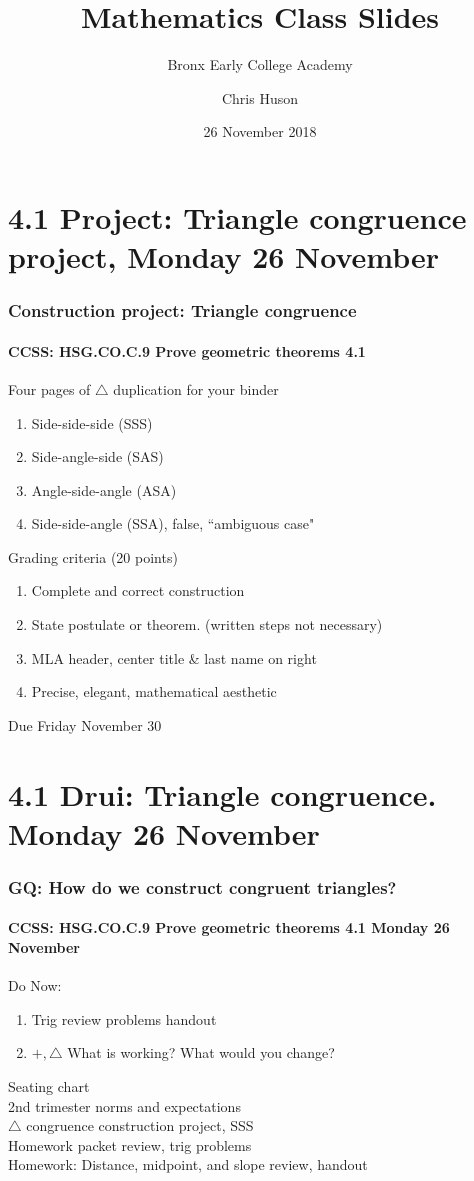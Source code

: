 \documentclass{beamer}
\title{Mathematics Class Slides}
\subtitle{Bronx Early College Academy}
\author{Chris Huson}
\date{26 November 2018}
\begin{document}
\frame{\titlepage}
\section[Outline]{}
\frame{\tableofcontents}


\section{4.1 Project: Triangle congruence project, Monday 26 November}
  \frame
  {
    \frametitle{Construction project: Triangle congruence}
    \framesubtitle{CCSS: HSG.CO.C.9 Prove geometric theorems  \alert{4.1}}

    \begin{block}{Four pages of $\triangle$ duplication for your binder}
    \begin{enumerate}
        \item Side-side-side (SSS)
        \item Side-angle-side (SAS)
        \item Angle-side-angle (ASA)
        \item Side-side-angle (SSA), false, ``ambiguous case"
    \end{enumerate}
        Grading criteria (20 points)
    \begin{enumerate}
        \item Complete and correct construction
        \item State postulate or theorem. (written steps not necessary)
        \item MLA header, center title \& last name on right
        \item Precise, elegant, mathematical aesthetic
    \end{enumerate}
    \end{block}
    Due Friday November 30
    }

  \section{4.1 Drui: Triangle congruence. Monday 26 November}
    \frame
    {
      \frametitle{GQ: How do we construct congruent triangles?}
      \framesubtitle{CCSS: HSG.CO.C.9 Prove geometric theorems  \alert{4.1 Monday 26 November}}

      \begin{block}{Do Now: }
        \begin{enumerate}
          \item Trig review problems handout
          \item $+, \triangle$ What is working? What would you change?
        \end{enumerate}
      \end{block}
      Seating chart \\
      2nd trimester norms and expectations \\
      $\triangle$ congruence construction project, SSS\\
      Homework packet review, trig problems \\[0.5cm]
      Homework: Distance, midpoint, and slope review, handout
    }
\end{document}
